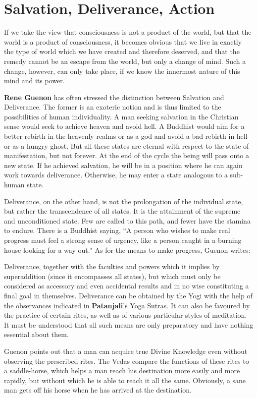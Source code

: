 \section{Salvation, Deliverance, Action}

\begin{quotex}
If we take the view that consciousness is not a product of the world, but that the world is a product of consciousness, it becomes obvious that we live in exactly the type of world which we have created and therefore deserved, and that the remedy cannot be an escape from the world, but only a change of mind. Such a change, however, can only take place, if we know the innermost nature of this mind and its power. 

\end{quotex}
\textbf{Rene Guenon} has often stressed the distinction between Salvation and Deliverance. The former is an exoteric notion and is thus limited to the possibilities of human individuality. A man seeking salvation in the Christian sense would seek to achieve heaven and avoid hell. A Buddhist would aim for a better rebirth in the heavenly realms or as a god and avoid a bad rebirth in hell or as a hungry ghost. But all these states are eternal with respect to the state of manifestation, but not forever. At the end of the cycle the being will pass onto a new state. If he achieved salvation, he will be in a position where he can again work towards deliverance. Otherwise, he may enter a state analogous to a sub-human state.

Deliverance, on the other hand, is not the prolongation of the individual state, but rather the transcendence of all states.  It is the attainment of the supreme and unconditioned state. Few are called to this path, and fewer have the stamina to endure. There is a Buddhist saying, ``A person who wishes to make real progress must feel a strong sense of urgency, like a person caught in a burning house looking for a way out." As for the means to make progress, Guenon writes:

\begin{quotex}
Deliverance, together with the faculties and powers which it implies by superaddition (since it encompasses all states), but which must only be considered as accessory and even accidental results and in no wise constituting a final goal in themselves. Deliverance can be obtained by the Yogi with the help of the observances indicated in \textbf{Patanjali}'s Yoga Sutras. It can also be favoured by the practice of certain rites, as well as of various particular styles of meditation. It must be understood that all such means are only preparatory and have nothing essential about them.

\end{quotex}
Guenon points out that a man can acquire true Divine Knowledge even without observing the prescribed rites. The Vedas compare the functions of these rites to a saddle-horse, which helps a man reach his destination more easily and more rapidly, but without which he is able to reach it all the same. Obviously, a sane man gets off his horse when he has arrived at the destination.

